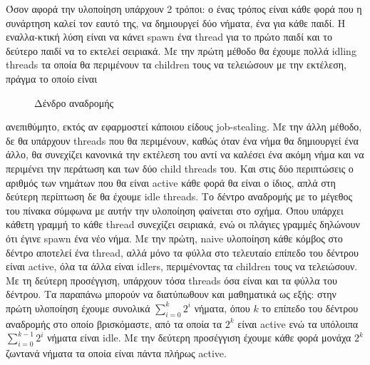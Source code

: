 \documentclass[11pt,a4paper,titlepage]{article}
\begin{document}
		Όσον αφορά την υλοποίηση υπάρχουν 2 τρόποι: ο ένας τρόπος είναι κάθε φορά που η συνάρτηση καλεί τον εαυτό της, να δημιουργεί δύο νήματα, ένα για κάθε παιδί. Η εναλλα-κτική λύση είναι να κάνει spawn ένα thread για το πρώτο παιδί και το δεύτερο παιδί να το εκτελεί σειριακά. Με την πρώτη μέθοδο θα έχουμε πολλά idling threads τα οποία θα περιμένουν τα children τους να τελειώσουν με την εκτέλεση, πράγμα το οποίο είναι
		\begin{figure}
			\caption{Δένδρο αναδρομής}			
		\end{figure}
		ανεπιθύμητο, εκτός αν 	εφαρμοστεί κάποιου είδους job-stealing. Με την άλλη μέθοδο, δε θα υπάρχουν threads που θα περιμένουν, καθώς όταν ένα νήμα θα δημιουργεί ένα άλλο, θα συνεχίζει κανονικά την εκτέλεση του αντί να καλέσει ένα ακόμη νήμα και να περιμένει την περάτωση και των δύο child threads του. Και στις δύο περιπτώσεις ο αριθμός των νημάτων που θα είναι active κάθε φορά θα είναι ο ίδιος, απλά στη δεύτερη περίπτωση δε θα έχουμε idle threads. Το δέντρο αναδρομής με το μέγεθος του πίνακα σύμφωνα με αυτήν την υλοποίηση φαίνεται στο σχήμα. Όπου υπάρχει κάθετη γραμμή το κάθε thread συνεχίζει σειριακά, ενώ οι πλάγιες γραμμές δηλώνουν ότι έγινε spawn ένα νέο νήμα. Με την πρώτη, naive υλοποίηση κάθε κόμβος στο δέντρο αποτελεί ένα thread, αλλά μόνο τα φύλλα στο τελευταίο επίπεδο του δέντρου είναι active, όλα τα άλλα είναι idlers, περιμένοντας τα children τους να τελειώσουν. Με τη δεύτερη προσέγγιση, υπάρχουν τόσα threads όσα είναι και τα φύλλα του δέντρου. Τα παραπάνω μπορούν να διατύπωθουν και μαθηματικά ως εξής: στην πρώτη υλοποίηση έχουμε συνολικά $\sum_{i=0}^{k}2^i$ νήματα, όπου $k$ το επίπεδο του δέντρου αναδρομής στο οποίο βρισκόμαστε, από τα οποία τα $2^k$ είναι active ενώ τα υπόλοιπα $\sum_{i=0}^{k-1}2^i$ νήματα είναι idle. Με την δεύτερη προσέγγιση έχουμε κάθε φορά μονάχα $2^k$ ζωντανά νήματα τα οποία είναι πάντα πλήρως active.\\
		
\end{document}
